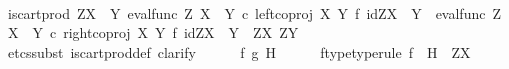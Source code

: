 \begin{isabellebody}
%
\isadelimproof
%
\endisadelimproof
%
\isatagproof
{}\isamarkupfalse%
\ {\isacharminus}{\kern0pt}\ \isanewline
\ \ \isamarkupfalse%
\ {\isachardoublequoteopen}is{\isacharunderscore}{\kern0pt}cart{\isacharunderscore}{\kern0pt}prod\ {\isacharparenleft}{\kern0pt}Z\isactrlbsup {\isacharparenleft}{\kern0pt}X\ {\isasymCoprod}\ Y{\isacharparenright}{\kern0pt}\isactrlesup {\isacharparenright}{\kern0pt}\ {\isacharparenleft}{\kern0pt}{\isacharparenleft}{\kern0pt}eval{\isacharunderscore}{\kern0pt}func\ Z\ {\isacharparenleft}{\kern0pt}X\ {\isasymCoprod}\ Y{\isacharparenright}{\kern0pt}\ {\isasymcirc}\isactrlsub c\ {\isacharparenleft}{\kern0pt}left{\isacharunderscore}{\kern0pt}coproj\ X\ Y{\isacharparenright}{\kern0pt}\ {\isasymtimes}\isactrlsub f\ {\isacharparenleft}{\kern0pt}id{\isacharparenleft}{\kern0pt}Z\isactrlbsup {\isacharparenleft}{\kern0pt}X\ {\isasymCoprod}\ Y{\isacharparenright}{\kern0pt}\isactrlesup {\isacharparenright}{\kern0pt}{\isacharparenright}{\kern0pt}\ {\isacharparenright}{\kern0pt}\isactrlsup {\isasymsharp}{\isacharparenright}{\kern0pt}\ {\isacharparenleft}{\kern0pt}{\isacharparenleft}{\kern0pt}eval{\isacharunderscore}{\kern0pt}func\ Z\ {\isacharparenleft}{\kern0pt}X\ {\isasymCoprod}\ Y{\isacharparenright}{\kern0pt}\ {\isasymcirc}\isactrlsub c\ {\isacharparenleft}{\kern0pt}right{\isacharunderscore}{\kern0pt}coproj\ X\ Y{\isacharparenright}{\kern0pt}\ {\isasymtimes}\isactrlsub f\ {\isacharparenleft}{\kern0pt}id{\isacharparenleft}{\kern0pt}Z\isactrlbsup {\isacharparenleft}{\kern0pt}X\ {\isasymCoprod}\ Y{\isacharparenright}{\kern0pt}\isactrlesup {\isacharparenright}{\kern0pt}{\isacharparenright}{\kern0pt}\ {\isacharparenright}{\kern0pt}\isactrlsup {\isasymsharp}{\isacharparenright}{\kern0pt}\ {\isacharparenleft}{\kern0pt}Z\isactrlbsup X\isactrlesup {\isacharparenright}{\kern0pt}\ {\isacharparenleft}{\kern0pt}Z\isactrlbsup Y\isactrlesup {\isacharparenright}{\kern0pt}{\isachardoublequoteclose}\isanewline
\ \ \isamarkupfalse%
\ {\isacharparenleft}{\kern0pt}etcs{\isacharunderscore}{\kern0pt}subst\ is{\isacharunderscore}{\kern0pt}cart{\isacharunderscore}{\kern0pt}prod{\isacharunderscore}{\kern0pt}def{}{\isacharcomma}{\kern0pt}\ clarify{\isacharparenright}{\kern0pt}\isanewline
\ \ \ \ \isamarkupfalse%
\ f\ g\ H\isanewline
\ \ \ \ \isamarkupfalse%
\ f{\isacharunderscore}{\kern0pt}type{\isacharbrackleft}{\kern0pt}type{\isacharunderscore}{\kern0pt}rule{\isacharbrackright}{\kern0pt}{\isacharcolon}{\kern0pt}\ {\isachardoublequoteopen}f\ {\isacharcolon}{\kern0pt}\ H\ {\isasymrightarrow}\ Z\isactrlbsup X\isactrlesup {\isachardoublequoteclose}\isanewline

\end{isabellebody}
